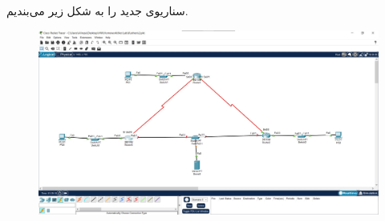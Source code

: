 \documentclass{article}
\begin{document}
\section{}%
\subsection{}
سناریوی جدید را به شکل زیر می‌بندیم.
\begin{figure}[H]
    \centering
    \includegraphics[width=1.0\textwidth]{figures/16.jpg}
    \caption{}
    \label{fig:fig1}
\end{figure}
\end{document}
